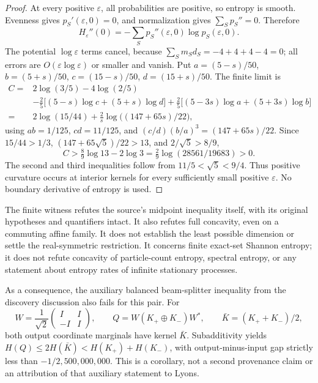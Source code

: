 \begin{cxrefutation}
\begin{proof}
At every positive $\varepsilon$, all probabilities are positive, so entropy
is smooth. Evenness gives $p_S'(\varepsilon,0)=0$, and normalization gives
$\sum_Sp_S''=0$. Therefore
\[
 H_\varepsilon''(0)=-\sum_Sp_S''(\varepsilon,0)\log p_S(\varepsilon,0).
\]
The potential $\log\varepsilon$ terms cancel, because
$\sum_Sm_Sd_S=-4+4+4-4=0$; all errors are
$O(\varepsilon\log\varepsilon)$ or smaller and vanish. Put
$a=(5-s)/50$, $b=(5+s)/50$, $c=(15-s)/50$, $d=(15+s)/50$. The finite limit is
\begin{align*}
 C={}&2\log(3/5)-4\log(2/5)\\
 &-\tfrac25\bigl[(5-s)\log c+(5+s)\log d\bigr]
 +\tfrac25\bigl[(5-3s)\log a+(5+3s)\log b\bigr]\\
 ={}&2\log(15/44)+\tfrac2s\log\bigl((147+65s)/22\bigr),
\end{align*}
using $ab=1/125$, $cd=11/125$, and
$(c/d)(b/a)^3=(147+65s)/22$. Since
$15/44>1/3$, $(147+65\sqrt5)/22>13$, and $2/\sqrt5>8/9$,
\[
 C>\tfrac89\log13-2\log3
 =\tfrac29\log(28561/19683)>0.
\]
The second and third inequalities follow from $11/5<\sqrt5<9/4$.
Thus positive curvature occurs at interior kernels for every sufficiently
small positive $\varepsilon$. No boundary derivative of entropy is used.
\end{proof}

\begin{remark}[Scope]
The finite witness refutes the source's midpoint inequality itself, with
its original hypotheses and quantifiers intact. It also refutes full
concavity, even on a commuting affine family. It does not establish the
least possible dimension or settle the real-symmetric restriction.
It concerns finite exact-set Shannon entropy; it does not refute concavity
of particle-count entropy, spectral entropy, or any statement about entropy
rates of infinite stationary processes.

As a consequence, the auxiliary balanced beam-splitter inequality from the
discovery discussion also fails for this pair. For
\[
 W=\frac1{\sqrt2}\begin{pmatrix}I&I\\-I&I\end{pmatrix},\qquad
 Q=W(K_+\oplus K_-)W^*,\qquad \bar K=(K_++K_-)/2,
\]
both output coordinate marginals have kernel $\bar K$. Subadditivity yields
$H(Q)\le2H(\bar K)<H(K_+)+H(K_-)$, with output-minus-input gap strictly
less than $-1/2{,}500{,}000{,}000$. This is a corollary, not a second
provenance claim or an attribution of that auxiliary statement to Lyons.
\end{remark}
\end{cxrefutation}
